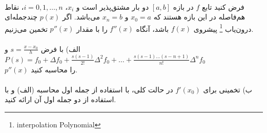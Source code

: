 \\
فرض کنید تابع \( f \) در بازه  \([a, b]\) دو بار مشتق‌پذیر است و \( x_i \)، \( i = 0, 1, \ldots , n\)، نقاط هم‌فاصله در این بازه‌ هستند که \( x_0 = a\) و \( x_n = b\) می‌باشد. اگر \( p(x) \) چندجمله‌ای درون‌یاب
\footnote{interpolation Polynomial}
پیشروی \( f(x) \) باشد، آنگاه \( f''(x) \) را با مقدار \( p''(x) \) تخمین می‌زنیم.
\\
\\
الف) با فرض
\( s = \frac{{x - x_0}}{{h}} \)
و
\( P(s) = f_0 + \Delta f_0 + \frac{{s(s - 1)}}{{2!}}\Delta^2 f_0 + \ldots + \frac{{s(s-1)\ldots(s-n+1)}}{{n!}}\Delta^n f_0 \)
\\
\(p''(x)\)
را محاسبه کنید.
\\
\\
ب) تخمینی برای \( f'(x_0) \) در حالت کلی، با استفاده از جمله اول محاسبه (الف) و با استفاده از دو جمله اول آن ارائه کنید.